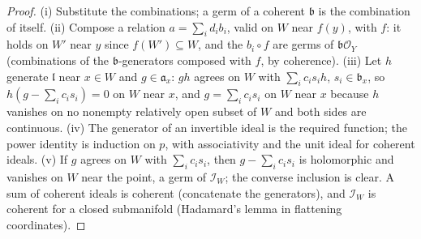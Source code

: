 \begin{proof}
\leanok
(i) Substitute the combinations; a germ of a coherent \(\mathfrak b\) is the combination of itself. (ii) Compose a
relation \(a=\sum_id_ib_i\), valid on \(W\) near \(f(y)\), with \(f\): it holds on \(W'\) near \(y\) since
\(f(W')\subseteq W\), and the \(b_i\circ f\) are germs of \(\mathfrak b\mathcal O_Y\) (combinations of the
\(\mathfrak b\)-generators composed with \(f\), by coherence). (iii) Let \(h\) generate \(\mathfrak l\) near \(x\in W\) and
\(g\in\mathfrak a_x\): \(gh\) agrees on \(W\) with \(\sum_ic_is_ih\), \(s_i\in\mathfrak b_x\), so \(h(g-\sum_ic_is_i)=0\) on
\(W\) near \(x\), and \(g=\sum_ic_is_i\) on \(W\) near \(x\) because \(h\) vanishes on no nonempty relatively open subset
of \(W\) and both sides are continuous. (iv) The generator of an invertible ideal is the required function; the
power identity is induction on \(p\), with associativity and the unit ideal for coherent ideals. (v) If \(g\) agrees on
\(W\) with \(\sum_ic_is_i\), then \(g-\sum_ic_is_i\) is holomorphic and vanishes on \(W\) near the point, a germ of
\(\mathcal I_W\); the converse inclusion is clear. A sum of coherent ideals is coherent (concatenate the generators),
and \(\mathcal I_W\) is coherent for a closed submanifold (Hadamard's lemma in flattening coordinates).
\end{proof}
